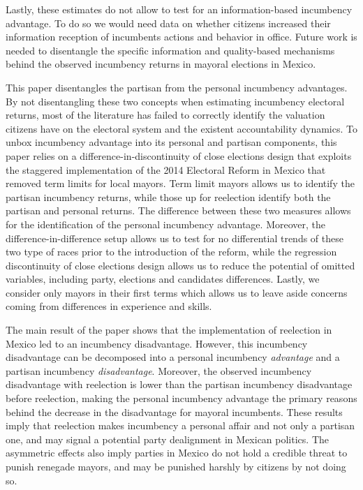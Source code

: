 \documentclass[12pt]{amsart}
\makeatletter
\def\section{\@startsection{section}{1}
	\z@{1.0\linespacing\@plus\linespacing}{.5\linespacing}{\Large}}
\numberwithin{equation}{section}
\theoremstyle{definition}
\theoremstyle{definition}
\theoremstyle{definition}
\makeatother
\begin{document}
Lastly, these estimates do not allow to test for an information-based incumbency advantage. To do so we would need data on whether citizens increased their information reception of incumbents actions and behavior in office. Future work is needed to disentangle the specific information and quality-based mechanisms behind the observed incumbency returns in mayoral elections in Mexico. 

  

\section{Conclusion} 

This paper disentangles the partisan from the personal incumbency advantages. By not disentangling these two concepts when estimating incumbency electoral returns, most of the literature has failed to correctly identify the valuation citizens have on the electoral system and the existent accountability dynamics. To unbox incumbency advantage into its personal and partisan components, this paper relies on a difference-in-discontinuity of close elections design that exploits the staggered implementation of the 2014 Electoral Reform in Mexico that removed term limits for local mayors. Term limit mayors allows us to identify the partisan incumbency returns, while those up for reelection identify both the partisan and personal returns. The difference between these two measures allows for the identification of the personal incumbency advantage. Moreover, the difference-in-difference setup allows us to test for no differential trends of these two type of races prior to the introduction of the reform, while the regression discontinuity of close elections design allows us to reduce the potential of omitted variables, including party, elections and candidates differences. Lastly, we consider only mayors in their first terms which allows us to leave aside concerns coming from differences in experience and skills. 

The main result of the paper shows that the implementation of reelection in Mexico led to an incumbency disadvantage. However, this incumbency disadvantage can be decomposed into a personal incumbency \emph{advantage} and a partisan incumbency  \emph{disadvantage}. Moreover, the observed incumbency disadvantage with reelection is lower than the partisan incumbency disadvantage before reelection, making the personal incumbency advantage the primary reasons behind the decrease in the disadvantage for mayoral incumbents. These results imply that reelection makes incumbency a personal affair and not only a partisan one, and may signal a potential party dealignment in Mexican politics. The asymmetric effects also imply parties in Mexico do not hold a credible threat to punish renegade mayors, and may be punished harshly by citizens by not doing so. 
\end{document}
